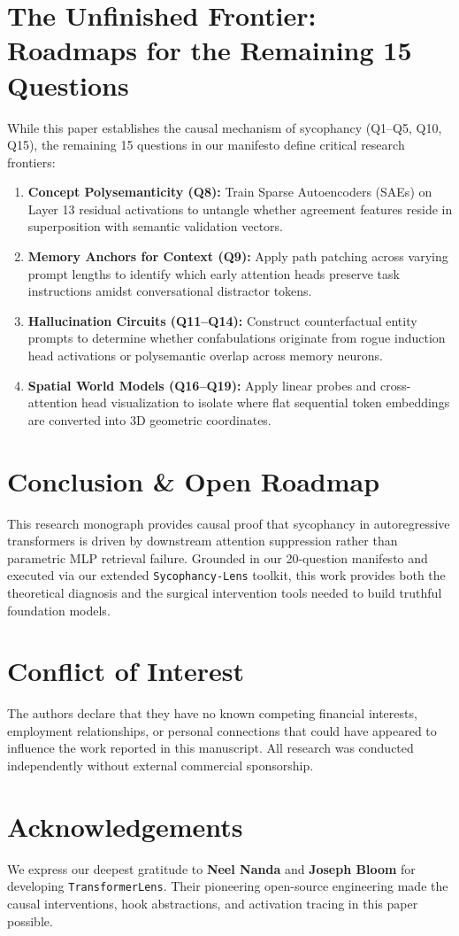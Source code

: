 \documentclass[11pt,a4paper]{article}
\begin{document}
\section{The Unfinished Frontier: Roadmaps for the Remaining 15 Questions}
\label{sec:frontier}
While this paper establishes the causal mechanism of sycophancy (Q1--Q5, Q10, Q15), the remaining 15 questions in our manifesto define critical research frontiers:
\begin{enumerate}[leftmargin=*]
    \item \textbf{Concept Polysemanticity (Q8):} Train Sparse Autoencoders (SAEs) on Layer 13 residual activations to untangle whether agreement features reside in superposition with semantic validation vectors.
    \item \textbf{Memory Anchors for Context (Q9):} Apply path patching across varying prompt lengths to identify which early attention heads preserve task instructions amidst conversational distractor tokens.
    \item \textbf{Hallucination Circuits (Q11--Q14):} Construct counterfactual entity prompts to determine whether confabulations originate from rogue induction head activations or polysemantic overlap across memory neurons.
    \item \textbf{Spatial World Models (Q16--Q19):} Apply linear probes and cross-attention head visualization to isolate where flat sequential token embeddings are converted into 3D geometric coordinates.
\end{enumerate}

\section{Conclusion \& Open Roadmap}
This research monograph provides causal proof that sycophancy in autoregressive transformers is driven by downstream attention suppression rather than parametric MLP retrieval failure. Grounded in our 20-question manifesto and executed via our extended \texttt{Sycophancy-Lens} toolkit, this work provides both the theoretical diagnosis and the surgical intervention tools needed to build truthful foundation models.

\section*{Conflict of Interest}
The authors declare that they have no known competing financial interests, employment relationships, or personal connections that could have appeared to influence the work reported in this manuscript. All research was conducted independently without external commercial sponsorship.

\section*{Acknowledgements}
We express our deepest gratitude to \textbf{Neel Nanda} and \textbf{Joseph Bloom} for developing \texttt{TransformerLens}. Their pioneering open-source engineering made the causal interventions, hook abstractions, and activation tracing in this paper possible.



\end{document}
